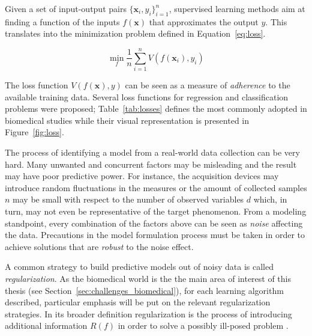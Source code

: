 
    Given a set of input-output pairs $\{\bm{x}_i, y_i\}_{i=1}^n$, supervised learning methods aim at finding a function of the inputs $f(\bm{x})$ that approximates the output $y$. This translates into the minimization problem defined in Equation~\eqref{eq:loss}.

    \begin{equation}\label{eq:loss}
      \min_f \frac{1}{n}\sum_{i=1}^n V(f(\bm{x}_i),y_i) %
    \end{equation}

    The loss function $V(f(\bm{x}),y)$ can be seen as a measure of \textit{adherence} to the available training data. Several loss functions for regression and classification problems were proposed; Table~\ref{tab:losses} defines the most commonly adopted in biomedical studies while their visual representation is presented in Figure~\ref{fig:loss}. 
        
    The process of identifying a model from a real-world data collection can be very hard. Many unwanted and concurrent factors may be misleading and the result may have poor predictive power. For instance, the acquisition devices may introduce random fluctuations in the measures or the amount of collected samples $n$ may be small with respect to the number of observed variables $d$ which, in turn, may not even be representative of the target phenomenon. From a modeling standpoint, every combination of the factors above can be seen as \textit{noise} affecting the data. Precautions in the model formulation process must be taken in order to achieve solutions that are \textit{robust} to the noise effect. 
    
    A common strategy to build predictive models out of noisy data is called \textit{regularization}. As the biomedical world is the the main area of interest of this thesis (see Section~\ref{sec:challenges_biomedical}), for each learning algorithm described, particular emphasis will be put on the relevant regularization strategies.    
    In its broader definition regularization is the process of introducing additional information $R(f)$ in order to solve a possibly ill-posed problem \cite{tikhonov1963solution, evgeniou2000regularization}. 
    
